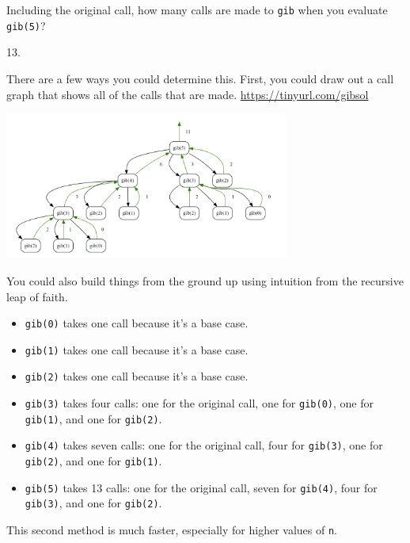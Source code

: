 \begin{blocksection}
\question Including the original call, how many calls are made to \lstinline{gib} when you evaluate \lstinline{gib(5)}?

\begin{solution}[2in]
13. 

There are a few ways you could determine this. First, you could draw out a call graph that shows all of the calls that are made. 
\url{https://tinyurl.com/gibsol}

\includegraphics[width=0.7\textwidth]{gibonacci.png}

You could also build things from the ground up using intuition from the recursive leap of faith. 
\begin{itemize}
    \item \lstinline{gib(0)} takes one call because it's a base case. 
    \item \lstinline{gib(1)} takes one call because it's a base case. 
    \item \lstinline{gib(2)} takes one call because it's a base case. 
    \item \lstinline{gib(3)} takes four calls: one for the original call, one for \lstinline{gib(0)}, one for \lstinline{gib(1)}, and one for \lstinline{gib(2)}. 
    \item \lstinline{gib(4)} takes seven calls: one for the original call, four for \lstinline{gib(3)}, one for \lstinline{gib(2)}, and one for \lstinline{gib(1)}. 
    \item \lstinline{gib(5)} takes 13 calls: one for the original call, seven for \lstinline{gib(4)}, four for \lstinline{gib(3)}, and one for \lstinline{gib(2)}. 
\end{itemize}
This second method is much faster, especially for higher values of \lstinline{n}. 
\end{solution}
\end{blocksection}

